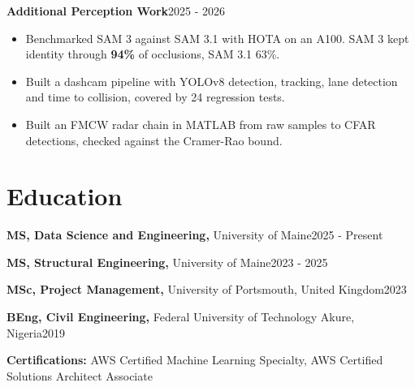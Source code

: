 \documentclass[10pt,letterpaper]{article}
\newcommand{\role}[3]{\vspace{2.8pt}\textbf{#1,} #2\hfill #3\par\vspace{1pt}}
\newcommand{\project}[2]{\vspace{2.8pt}\textbf{#1}\hfill #2\par\vspace{1pt}}
\newcommand{\key}[1]{\textbf{#1}}          %
\newcommand{\AWS}{\mbox{A}\mbox{W}\mbox{S}}
\begin{document}
\project{Additional Perception Work}{2025 - 2026}
\begin{itemize}
  \item Benchmarked SAM 3 against SAM 3.1 with HOTA on an A100. SAM 3 kept identity through \key{94\%} of occlusions, SAM 3.1 63\%.
  \item Built a dashcam pipeline with YOLOv8 detection, tracking, lane detection and time to collision, covered by 24 regression tests.
  \item Built an FMCW radar chain in MATLAB from raw samples to CFAR detections, checked against the Cramer-Rao bound.
\end{itemize}

\section{Education}
\role{MS, Data Science and Engineering}{University of Maine}{2025 - Present}
\role{MS, Structural Engineering}{University of Maine}{2023 - 2025}
\role{MSc, Project Management}{University of Portsmouth, United Kingdom}{2023}
\role{BEng, Civil Engineering}{Federal University of Technology Akure, Nigeria}{2019}
\vspace{2.8pt}\textbf{Certifications:} \AWS{} Certified Machine Learning Specialty, \AWS{} Certified Solutions Architect Associate\par
\end{document}
